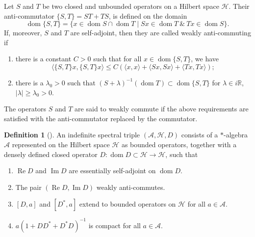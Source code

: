 \documentclass{amsart}
\theoremstyle{definition}
\newtheorem{definition}[theorem]{Definition}
\theoremstyle{remark}
\DeclareMathOperator{\dom}{dom}
\DeclareMathOperator{\Ree}{Re}
\DeclareMathOperator{\Imm}{Im}
\numberwithin{equation}{section}
\begin{document}
Let $S$ and $T$ be two closed and unbounded operators on a Hilbert space $\mathcal{H}$. Their anti-commutator $\{S,T\}=ST+TS$, is defined on the domain
\begin{equation*}
    \dom \{S,T\}=\{x\in \dom S\cap\dom T\mid Sx\in\dom T~\&~Tx\in \dom S\}.
\end{equation*}
If, moreover, $S$ and $T$ are self-adjoint, then they are called weakly anti-commuting if \cite[Definition 2.1]{lesch_mesland_2019}
\begin{enumerate}
    \item there is a constant $C>0$ such that for all $x\in\dom \{S,T\}$, we have
    \begin{equation*}
        \langle \{S,T\}x,\{S,T\}x\rangle\leq C(\langle x,x\rangle+\langle Sx,Sx\rangle+\langle Tx,Tx\rangle);
    \end{equation*}
    \item there is a $\lambda_0>0$ such that $(S+\lambda)^{-1}(\dom T)\subset\dom\{S,T\}$ for $\lambda\in i\mathbb{R}$, $|\lambda|\geq \lambda_0>0$.
\end{enumerate}
The operators $S$ and $T$ are said to weakly commute if the above requirements are satisfied with the anti-commutator replaced by the commutator.


\begin{definition}[\cite{dungen_2019}]\label{indefinite_spectral_triple}
    An indefinite spectral triple $(\mathcal{A},\mathcal{H},D)$ consists of a $*$-algebra $\mathcal{A}$ represented on the Hilbert space $\mathcal{H}$ as bounded operators, together with a densely defined closed operator $D\colon \dom D\subset\mathcal{H}\rightarrow\mathcal{H}$, such that
    \begin{enumerate}[noitemsep]
        \item $\Ree D$ and $\Imm D$ are essentially self-adjoint on $\dom D$.
        \item The pair $(\Ree D,\Imm D)$ weakly anti-commutes.
        \item $[D,a]$ and $[D^*,a]$ extend to bounded operators on $\mathcal{H}$ for all $a\in\mathcal{A}$.
        \item $a(1+DD^*+D^*D)^{-1}$ is compact for all $a\in\mathcal{A}$.
    \end{enumerate}
\end{definition}
\end{document}
